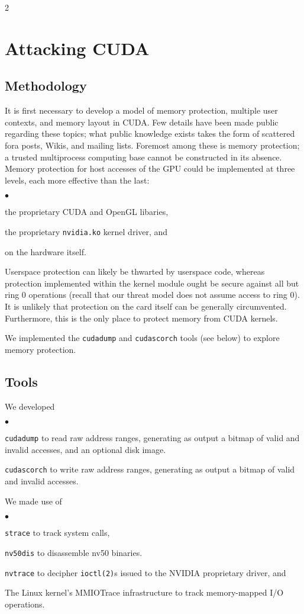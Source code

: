\documentclass[letterpaper,10pt]{article}
\newcommand{\squishlist}{\begin{list}{$\bullet$}
  {\setlength{\itemsep}{0pt}
    \setlength{\parsep}{3pt}
    \setlength{\topsep}{3pt}
    \setlength{\partopsep}{0pt}
    \setlength{\leftmargin}{1.5em}
    \setlength{\labelwidth}{1em}
    \setlength{\labelsep}{0.5em}
  } }
\newcommand{\squishend}{\end{list}}
\begin{document}
\begin{multicols}{2}
\section{Attacking CUDA}
\subsection{Methodology}
It is first necessary to develop a model of memory protection, multiple user
contexts, and memory layout in CUDA. Few details have been made public
regarding these topics; what public knowledge exists takes the form of
scattered fora posts, Wikis, and mailing lists. Foremost among these is memory
protection; a trusted multiprocess computing base cannot be constructed in its
absence. Memory protection for host accesses of the GPU could be implemented at
three levels, each more effective than the last:
\squishlist
\item the proprietary CUDA and OpenGL libaries,
\item the proprietary \texttt{nvidia.ko} kernel driver, and
\item on the hardware itself.
\squishend
Userspace protection can likely be thwarted by userspace code, whereas
protection implemented within the kernel module ought be secure against
all but ring 0 operations (recall that our threat model does not assume access
to ring 0). It is unlikely that protection on the card itself can be generally
circumvented. Furthermore, this is the only place to protect memory from CUDA
kernels.

We implemented the \texttt{cudadump} and
\texttt{cudascorch} tools (see below)%
to explore memory protection.

\subsection{Tools}
We developed
\squishlist
\item \texttt{cudadump} to read raw address ranges, generating as output a
bitmap of valid and invalid accesses, and an optional disk image.
\item \texttt{cudascorch} to write raw address ranges, generating as output a
bitmap of valid and invalid accesses.
\squishend
We made use of
\squishlist
\item \texttt{strace}\cite{stracecode} to track system calls,
\item \texttt{nv50dis}\cite{nv50dis} to disassemble nv50 binaries.
\item \texttt{nvtrace}\cite{nvtrace} to decipher \texttt{ioctl(2)}s
issued to the NVIDIA proprietary driver, and
\item The Linux kernel's MMIOTrace\cite{mmiotrace}
infrastructure to track memory-mapped I/O operations.
\squishend



\end{multicols}
\end{document}
